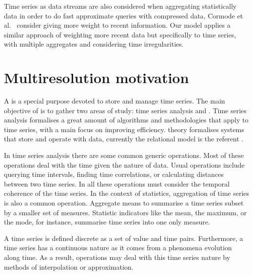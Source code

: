 Time series as data streams are also considered when aggregating
statistically data in order to do fast approximate queries with
compressed data, Cormode et al.\ \cite{cormode08:pods} consider giving
more weight to recent information.  Our  model applies a similar
approach of weighting more recent data but specifically to time
series, with multiple aggregates and considering time irregularities.







\section{Multiresolution motivation}
\label{sec:features}

A  is a special purpose  devoted to store and
manage time series.  The main objective of  is to gather
two areas of study: time series analysis and .  Time series
analysis formalises a great amount of algorithms and methodologies
that apply to time series, with a main focus on improving
efficiency.  theory formalises systems that store and
operate with data, currently the relational model is the referent
\cite{date:introduction}.



In time series analysis there are some common generic operations.
Most of these operations deal with the time given the nature of data.
Usual operations include querying time intervals, finding time
correlations, or calculating distances between two time series. In
all these operations  must consider the temporal coherence
of the time series.  In the context of statistics, aggregation of time
series is also a common operation. Aggregate means to summarise a time
series subset by a smaller set of measures. Statistic indicators like
the mean, the maximum, or the mode, for instance, summarise time
series into one only measure.

A time series is defined discrete as a set of value and time
pairs. Furthermore, a time series has a continuous nature as it comes
from a phenomena evolution along time. As a result, 
operations may deal with this time series nature by methods of
interpolation or approximation.



